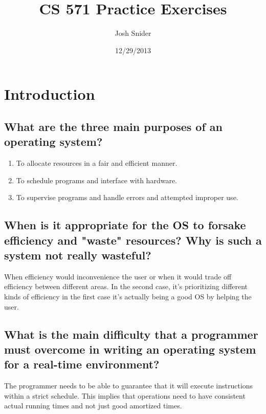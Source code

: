\documentclass{book}%
\title{CS 571 Practice Exercises}
\author{Josh Snider}
\date{12/29/2013}
\begin{document}
\maketitle
\setcounter{tocdepth}{0}
\tableofcontents
\chapter{Introduction}
\section{What are the three main purposes of an operating system?}
\begin{enumerate}
\item To allocate resources in a fair and efficient manner.
\item To schedule programs and interface with hardware.
\item To supervise programs and handle errors and attempted improper use.
\end{enumerate}
\section{When is it appropriate for the OS to forsake efficiency and "waste" resources? Why is such a system not really wasteful?}
When efficiency would inconvenience the user or when it would trade off efficiency between different areas. In the second case, it's prioritizing different kinds of efficiency in the first case it's actually being a good OS by helping the user.
\section{What is the main difficulty that a programmer must overcome in writing an operating system for a real-time environment?}
The programmer needs to be able to guarantee that it will execute instructions within a strict schedule. This implies that operations need to have consistent actual running times and not just good amortized times.
\end{document}
